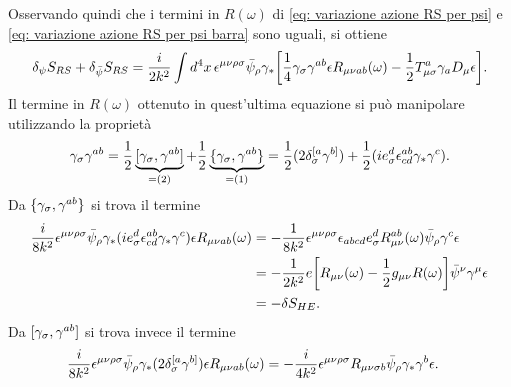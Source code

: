 Osservando quindi che i termini in $R(\omega)$ di \eqref{eq: variazione azione RS per psi} e \eqref{eq: variazione azione RS per psi barra} sono uguali, si ottiene 
\begin{equation}
    \begin{split}
        \delta_\psi S_{RS} + \delta_{\bar{\psi}}S_{RS} = \frac{i}{2k^2}\int d^4x\,\epsilon^{\mu\nu\rho\sigma}\bar{\psi}_\rho\gamma_*\bigg[\frac{1}{4}\gamma_\sigma\gamma^{ab}\epsilon R_{\mu\nu ab}(\omega) - \frac{1}{2}T^a_{\mu\sigma}\gamma_a D_\mu\epsilon\bigg].
    \end{split}
\end{equation}
Il termine in $R(\omega)$ ottenuto in quest'ultima equazione si può manipolare utilizzando la proprietà
\begin{equation}
    \gamma_\sigma \gamma^{ab} = \frac{1}{2}\underbrace{[\gamma_\sigma,\gamma^{ab}]}_{=(2)} + \frac{1}{2}\underbrace{\{\gamma_\sigma,\gamma^{ab}\}}_{=(1)} = \frac{1}{2}(2\delta_\sigma^{[a}\gamma^{b]}) + \frac{1}{2}(ie^d_\sigma\epsilon^{ab}_{cd}\gamma_*\gamma^c).
\end{equation}
Da $\{\gamma_\sigma,\gamma^{ab}\}$ si trova il termine 
\begin{equation}
    \begin{split}
        \frac{i}{8k^2}\epsilon^{\mu\nu\rho\sigma}\bar{\psi}_\rho\gamma_*(ie^d_\sigma\epsilon^{ab}_{cd}\gamma_*\gamma^c)\epsilon R_{\mu\nu ab}(\omega) &= -\frac{1}{8k^2}\epsilon^{\mu\nu\rho\sigma}\epsilon_{abcd}e^d_\sigma R^{ab}_{\mu\nu}(\omega)\bar{\psi}_\rho\gamma^c\epsilon \\
        &= -\frac{1}{2k^2}e\bigg[R_{\mu\nu}(\omega) -\frac{1}{2}g_{\mu\nu}R(\omega)\bigg]\bar{\psi}^\nu\gamma^\mu\epsilon \\
        &= -\delta S_{HE}.
    \end{split}
\end{equation}
Da $[\gamma_\sigma,\gamma^{ab}]$ si trova invece il termine
\begin{equation}
    \begin{split}
        \frac{i}{8k^2}\epsilon^{\mu\nu\rho\sigma}\bar{\psi}_\rho\gamma_*(2\delta_\sigma^{[a}\gamma^{b]})\epsilon R_{\mu\nu ab}(\omega) &= -\frac{i}{4k^2}\epsilon^{\mu\nu\rho\sigma}R_{\mu\nu\sigma b}\bar{\psi}_\rho\gamma_*\gamma^b\epsilon.
    \end{split}
\end{equation}
